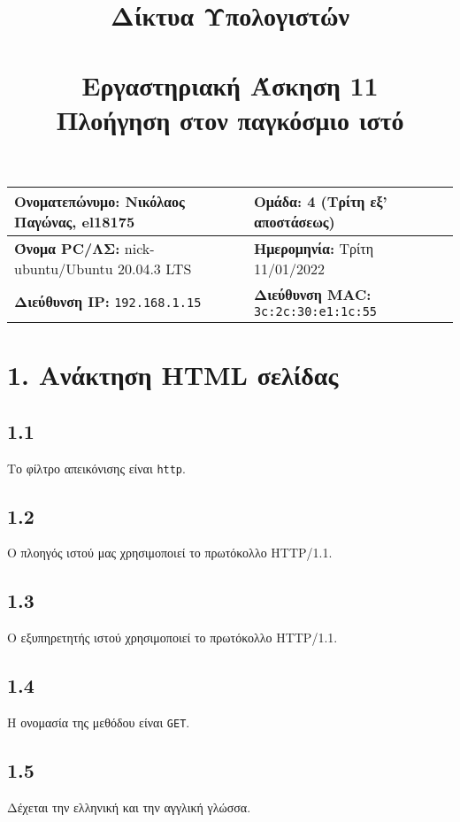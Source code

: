 

\newcommand{\imagesPath}{.}

\title{
	\textbf{Δίκτυα Υπολογιστών} \\~\\
	Εργαστηριακή Άσκηση 11 \\ 
	Πλοήγηση στον παγκόσμιο ιστό
}
\author{}
\date{}


	\maketitle
	
	\begin{tabular}{|l|l|}
		\hline
		\textbf{Ονοματεπώνυμο:} Νικόλαος Παγώνας, el18175 & \textbf{Ομάδα:} 4 (Τρίτη εξ' αποστάσεως) \\
		\hline
		\textbf{Όνομα PC/ΛΣ:} nick-ubuntu/Ubuntu 20.04.3 LTS & \textbf{Ημερομηνία:} Τρίτη 11/01/2022 \\
		\hline
		\textbf{Διεύθυνση IP:} \verb|192.168.1.15| & \textbf{Διεύθυνση MAC:} \verb|3c:2c:30:e1:1c:55| \\
		\hline
	\end{tabular}

	\section*{1. Ανάκτηση HTML σελίδας}
		
		\subsection*{1.1}
			Το φίλτρο απεικόνισης είναι \verb|http|.

		\subsection*{1.2}
			Ο πλοηγός ιστού μας χρησιμοποιεί το πρωτόκολλο HTTP/1.1.

		\subsection*{1.3}
			Ο εξυπηρετητής ιστού χρησιμοποιεί το πρωτόκολλο HTTP/1.1.

		\subsection*{1.4}
			Η ονομασία της μεθόδου είναι \verb|GET|.

		\subsection*{1.5}
			Δέχεται την ελληνική και την αγγλική γλώσσα.

